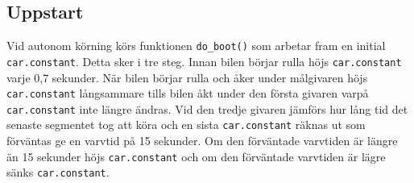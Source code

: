 \subsection{Uppstart} 
\label{sec:systembeskrivning:uppstart}
Vid autonom körning körs funktionen \texttt{do\_boot()} som arbetar fram en
initial \texttt{car.constant}. Detta sker i tre steg. Innan bilen börjar rulla
höjs \texttt{car.constant} varje 0,7 sekunder. När bilen börjar rulla och åker
under målgivaren höjs \texttt{car.constant} långsammare tills bilen åkt under
den första givaren varpå \texttt{car.constant} inte längre ändras. Vid den
tredje givaren jämförs hur lång tid det senaste segmentet tog att köra och en
sista \texttt{car.constant} räknas ut som förväntas ge en varvtid på 15
sekunder. Om den förväntade varvtiden är längre än 15 sekunder höjs
\texttt{car.constant} och om den förväntade varvtiden är lägre sänks
\texttt{car.constant}.

